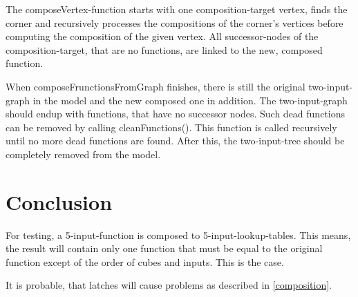 \documentclass[colorback,accentcolor=tud1c,11pt]{tudreport}
\begin{document}
The composeVertex-function starts with one composition-target vertex, finds the corner and recursively processes the compositions of the corner's vertices before computing the composition of the given vertex. All successor-nodes of the composition-target, that are no functions, are linked to the new, composed function.

When composeFrunctionsFromGraph finishes, there is still the original two-input-graph in the model and the new composed one in addition. The two-input-graph should endup with functions, that have no successor nodes. Such dead functions can be removed by calling cleanFunctions(). This function is called recursively until no more dead functions are found. After this, the two-input-tree should be completely removed from the model.



\chapter{Conclusion}
For testing, a 5-input-function is composed to 5-input-lookup-tables. This means, the result will contain only one function that must be equal to the original function except of the order of cubes and inputs. This is the case.

It is probable, that latches will cause problems as described in \ref{composition}.





\end{document}
